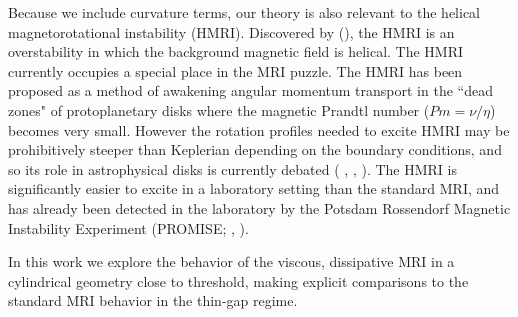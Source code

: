 \documentclass{emulateapj}
\newcommand{\citei}[1]{\citeauthor{#1} \citeyear{#1}}
\begin{document}
Because we include curvature terms, our theory is also relevant to the helical magnetorotational instability (HMRI). Discovered by \citeauthor{Hollerbach:2005tr} (\citeyear{Hollerbach:2005tr}), the HMRI is an overstability in which the background magnetic field is helical. The HMRI currently occupies a special place in the MRI puzzle. The HMRI has been proposed as a method of awakening angular momentum transport in the ``dead zones" of protoplanetary disks where the magnetic Prandtl number ($Pm = \nu/\eta$) becomes very small. However the rotation profiles needed to excite HMRI may be prohibitively steeper than Keplerian depending on the boundary conditions, and so its role in astrophysical disks is currently debated (\citei{Liu:2006}, \citei{Rudiger:2007}, \citei{Kirillov:2013}). The HMRI is significantly easier to excite in a laboratory setting than the standard MRI, and has already been detected in the laboratory by the Potsdam Rossendorf Magnetic Instability Experiment (PROMISE; \citei{Stefani:2006iv}, \citei{Stefani:2009hp}). %

In this work we explore the behavior of the viscous, dissipative MRI in a cylindrical geometry close to threshold, making explicit comparisons to the standard MRI behavior in the thin-gap regime. 
\end{document}
